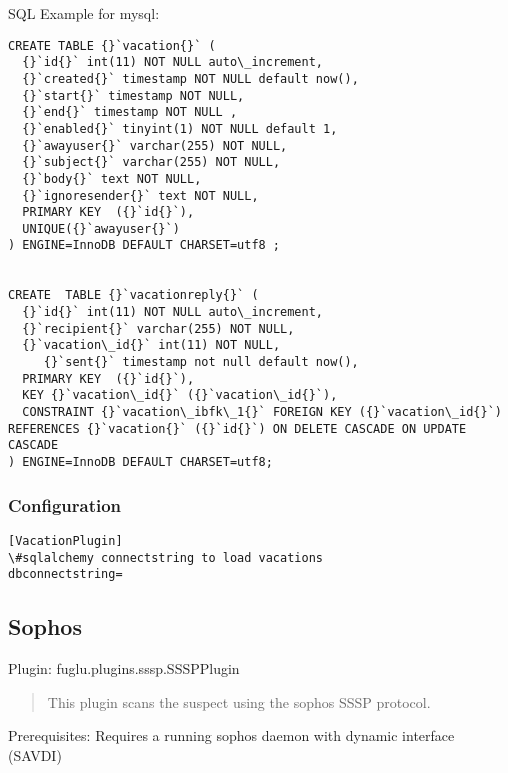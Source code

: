 \documentclass[letterpaper,10pt,english]{sphinxmanual}
\begin{document}
SQL Example for mysql:

\begin{Verbatim}[commandchars=\\\{\}]
CREATE TABLE {}`vacation{}` (
  {}`id{}` int(11) NOT NULL auto\_increment,
  {}`created{}` timestamp NOT NULL default now(),
  {}`start{}` timestamp NOT NULL,
  {}`end{}` timestamp NOT NULL ,
  {}`enabled{}` tinyint(1) NOT NULL default 1,
  {}`awayuser{}` varchar(255) NOT NULL,
  {}`subject{}` varchar(255) NOT NULL,
  {}`body{}` text NOT NULL,
  {}`ignoresender{}` text NOT NULL,
  PRIMARY KEY  ({}`id{}`),
  UNIQUE({}`awayuser{}`)
) ENGINE=InnoDB DEFAULT CHARSET=utf8 ;


CREATE  TABLE {}`vacationreply{}` (
  {}`id{}` int(11) NOT NULL auto\_increment,
  {}`recipient{}` varchar(255) NOT NULL,
  {}`vacation\_id{}` int(11) NOT NULL,
     {}`sent{}` timestamp not null default now(),
  PRIMARY KEY  ({}`id{}`),
  KEY {}`vacation\_id{}` ({}`vacation\_id{}`),
  CONSTRAINT {}`vacation\_ibfk\_1{}` FOREIGN KEY ({}`vacation\_id{}`) REFERENCES {}`vacation{}` ({}`id{}`) ON DELETE CASCADE ON UPDATE CASCADE
) ENGINE=InnoDB DEFAULT CHARSET=utf8;
\end{Verbatim}


\subsubsection{Configuration}
\label{plugins-index:id4}
\begin{Verbatim}[commandchars=\\\{\}]
[VacationPlugin]
\#sqlalchemy connectstring to load vacations
dbconnectstring=
\end{Verbatim}


\subsection{Sophos}
\label{plugins-index:sophos}
Plugin: fuglu.plugins.sssp.SSSPPlugin
\begin{quote}

This plugin scans the suspect using the sophos SSSP protocol.
\end{quote}

Prerequisites: Requires a running sophos daemon with dynamic interface (SAVDI)
\end{document}
